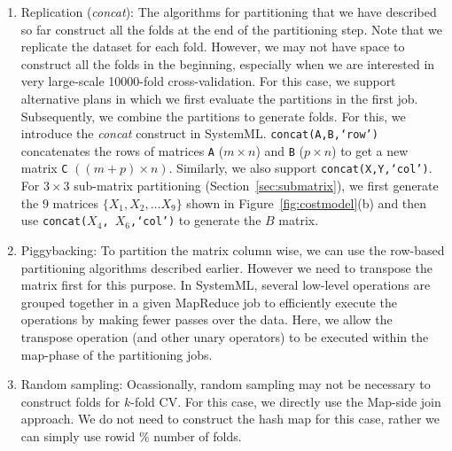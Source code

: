 \documentclass{vldb}
\newcommand{\topic}[1]{\par \smallskip \smallskip \noindent{\bf \uline{#1}}}
\begin{document}
\topic{Other optimization}
\begin{enumerate}
\item {Replication ({\em concat}):}
The algorithms for partitioning that we have described so far construct all the
folds at the end of the partitioning step. Note that we replicate the dataset for
each fold. However, we may not have space to construct all the folds in the
beginning, especially when we are interested in very large-scale 10000-fold
cross-validation. For this case, we support alternative plans in which we first
evaluate the partitions in the first job. Subsequently, we combine the
partitions to generate folds. For this, we introduce the {\em concat} construct
in SystemML. {\tt concat(A,B,`row')} concatenates the rows of matrices {\tt A}
($m\times n$) and {\tt B} ($p\times n$) to get a new matrix {\tt C}
$((m+p)\times n)$. Similarly, we also support {\tt concat(X,Y,`col')}. For
$3\times 3$ sub-matrix partitioning (Section~\ref{sec:submatrix}), we first
generate the $9$ matrices $\{X_1, X_2, \dots X_9\}$ shown in
Figure~\ref{fig:costmodel}(b) and then use {\tt concat($X_4$, $X_6$,`col')} to
generate the $B$ matrix.

\item {Piggybacking:}
To partition the matrix column wise, we can use the row-based partitioning
algorithms described earlier. However we need to transpose the matrix first for
this purpose. In SystemML, several low-level operations are grouped together in
a given MapReduce job to efficiently execute the operations by making fewer
passes over the data. Here, we allow the transpose operation (and other unary
operators) to be executed within the map-phase of the partitioning jobs.

\item {Random sampling:} Ocassionally, random sampling may not be necessary to
construct folds for $k$-fold CV. For this case, we directly use the Map-side
join approach. We do not need to construct the hash map for this case, rather we
can simply use rowid \% number of folds.
\end{enumerate}
\end{document}
